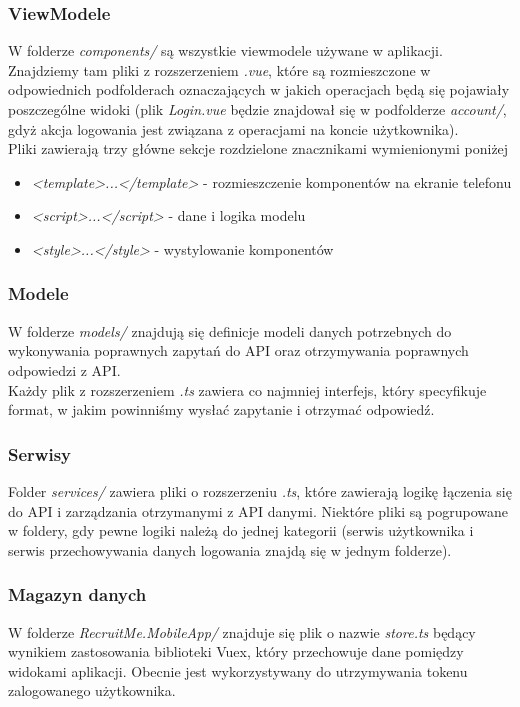 \documentclass{article}
\begin{document}
\subsubsection{ViewModele}
W folderze \emph{components/} są wszystkie viewmodele używane w aplikacji. Znajdziemy tam pliki z rozszerzeniem \emph{.vue}, które są rozmieszczone w odpowiednich podfolderach oznaczających w jakich operacjach będą się pojawiały poszczególne widoki (plik \emph{Login.vue} będzie znajdował się w podfolderze \emph{account/}, gdyż akcja logowania jest związana z operacjami na koncie użytkownika). \\
Pliki zawierają trzy główne sekcje rozdzielone znacznikami wymienionymi poniżej
\begin{itemize}
    \item \emph{<template>...</template>} - rozmieszczenie komponentów na ekranie telefonu
    \item \emph{<script>...</script>} - dane i logika modelu
    \item \emph{<style>...</style>} - wystylowanie komponentów
\end{itemize}

\subsubsection{Modele}
W folderze \emph{models/} znajdują się definicje modeli danych potrzebnych do wykonywania poprawnych zapytań do API oraz otrzymywania poprawnych odpowiedzi z API. \\
Każdy plik z rozszerzeniem \emph{.ts} zawiera co najmniej interfejs, który specyfikuje format, w jakim powinniśmy wysłać zapytanie i otrzymać odpowiedź.

\subsubsection{Serwisy}
Folder \emph{services/} zawiera pliki o rozszerzeniu \emph{.ts}, które zawierają logikę łączenia się do API i zarządzania otrzymanymi z API danymi. Niektóre pliki są pogrupowane w foldery, gdy pewne logiki należą do jednej kategorii (serwis użytkownika i serwis przechowywania danych logowania znajdą się w jednym folderze).

\subsubsection{Magazyn danych}
W folderze \emph{RecruitMe.MobileApp/} znajduje się plik o nazwie \emph{store.ts} będący wynikiem zastosowania biblioteki Vuex, który przechowuje dane pomiędzy widokami aplikacji. Obecnie jest wykorzystywany do utrzymywania tokenu zalogowanego użytkownika.
\end{document}
